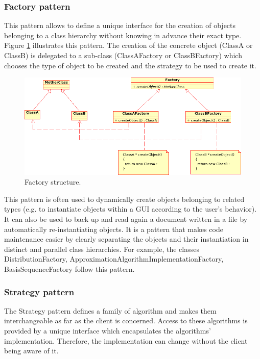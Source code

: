 \label{factory}\subsubsection{Factory pattern}

This pattern allows to define a unique interface for the creation of objects belonging to a class hierarchy without knowing in advance their exact type.
Figure \ref{fig:factory} illustrates this pattern.
The creation of the concrete object (ClassA or ClassB) is delegated to a sub-class (ClassAFactory or ClassBFactory) which chooses the type of object to be created and the strategy to be used to create it.

\begin{figure}[htb]
\begin{center}
\includegraphics[scale=0.5]{Figures/modeling_notions/factory.png}
\caption{Factory structure.}\label{fig:factory}
\end{center}
\end{figure}

This pattern is often used to dynamically create objects belonging to related types (e.g. to instantiate objects within a GUI according to the user's behavior).
It can also be used to back up and read again a document written in a file by automatically re-instantiating objects.
It is a pattern that makes code maintenance easier by clearly separating the objects and their instantiation in distinct and parallel class hierarchies.
For example, the classes DistributionFactory, ApproximationAlgorithmImplementationFactory, BasisSequenceFactory follow this pattern.

\label{strategy}\subsubsection{Strategy pattern}

The Strategy pattern defines a family of algorithm and makes them interchangeable as far as the client is concerned. Access to these algorithms is provided by a unique interface which encapsulates the algorithms' implementation. Therefore, the implementation can change without the client being aware of it.


